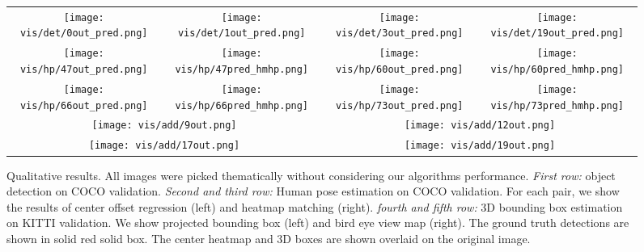 \documentclass[10pt,twocolumn,letterpaper]{article}
\begin{document}
\begin{figure*}[t]
\centering
     \begin{tabular}{cccc}
     \texttt{[image: vis/det/0out\_pred.png]}
      &\texttt{[image: vis/det/1out\_pred.png]}
&\texttt{[image: vis/det/3out\_pred.png]}
      & \texttt{[image: vis/det/19out\_pred.png]} \\
\texttt{[image: vis/hp/47out\_pred.png]}
      &\texttt{[image: vis/hp/47pred\_hmhp.png]}
      &\texttt{[image: vis/hp/60out\_pred.png]}
      &\texttt{[image: vis/hp/60pred\_hmhp.png]} \\
     \texttt{[image: vis/hp/66out\_pred.png]}
      &\texttt{[image: vis/hp/66pred\_hmhp.png]}
      &\texttt{[image: vis/hp/73out\_pred.png]}
      &\texttt{[image: vis/hp/73pred\_hmhp.png]} \\
      \multicolumn{2}{c}{\texttt{[image: vis/add/9out.png]}}
      &\multicolumn{2}{c}{\texttt{[image: vis/add/12out.png]}} \\
      \multicolumn{2}{c}{\texttt{[image: vis/add/17out.png]}}
      &\multicolumn{2}{c}{\texttt{[image: vis/add/19out.png]}} \\
      \end{tabular}
      \caption{Qualitative results. All images were picked thematically without considering our algorithms performance. \emph{First row:} object detection on COCO validation. \emph{Second and third row:} Human pose estimation on COCO validation. For each pair, we show the results of center offset regression (left) and heatmap matching (right). \emph{fourth and fifth row:} 3D bounding box estimation on KITTI validation. We show projected bounding box (left) and bird eye view map (right). The ground truth detections are shown in solid red solid box. The center heatmap and 3D boxes are shown overlaid on the original image.}
      \label{fig:demo}
\end{figure*}
\end{document}
